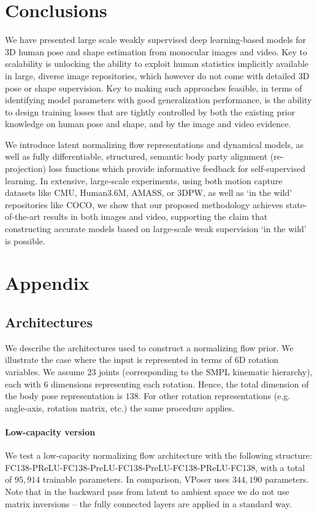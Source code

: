 \documentclass[runningheads]{llncs}
\begin{document}
\section{Conclusions}

We have presented large scale weakly supervised deep learning-based models for 3D human pose and shape estimation from monocular images and video. Key to scalability is unlocking the ability to exploit human statistics implicitly available in large, diverse image repositories, which however do not come with detailed 3D pose or shape supervision. Key to making such approaches feasible, in terms of identifying model parameters with good generalization performance, is the ability to design training losses that are tightly controlled by both the existing prior knowledge on human pose and shape, and by the image and video evidence. 

We introduce latent normalizing flow representations and dynamical models, as well as fully differentiable, structured, semantic body party alignment (re-projection) loss functions which provide informative feedback for self-supervised learning. In extensive, large-scale experiments, using both motion capture datasets like CMU, Human3.6M, AMASS, or 3DPW, as well as `in the wild' repositories like COCO, we show that our proposed methodology achieves state-of-the-art results in both images and video, supporting the claim that constructing accurate models based on large-scale weak supervision `in the wild' is possible.

\clearpage
\section{Appendix}
\subsection{Architectures}
We describe the architectures used to construct a normalizing flow prior. We illustrate the case where the input is represented in terms of 6D rotation variables. We assume $23$ joints (corresponding to the SMPL kinematic hierarchy), each with $6$ dimensions representing each rotation. Hence, the total dimension of the body pose representation is $138$. For other rotation representations (e.g. angle-axis, rotation matrix, etc.) the same procedure applies.

\paragraph{Low-capacity version} We test a low-capacity normalizing flow architecture with the following structure: FC138-PReLU-FC138-PreLU-FC138-PreLU-FC138-PReLU-FC138, with a total of $95,914$ trainable parameters. In comparison, VPoser\cite{pavlakoscvpr2019} uses $344,190$ parameters. Note that in the backward pass from latent to ambient space we do not use matrix inversions -- the fully connected layers are applied in a standard way.
\end{document}

